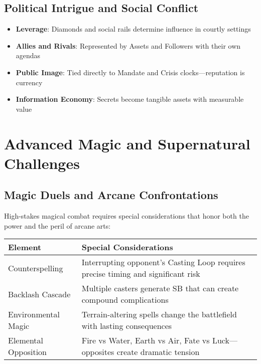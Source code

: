 \subsection*{Political Intrigue and Social Conflict}

\begin{itemize}
    \item \textbf{Leverage}: Diamonds and social rails determine influence in courtly settings
    \item \textbf{Allies and Rivals}: Represented by Assets and Followers with their own agendas
    \item \textbf{Public Image}: Tied directly to Mandate and Crisis clocks---reputation is currency
    \item \textbf{Information Economy}: Secrets become tangible assets with measurable value
\end{itemize}

\section*{Advanced Magic and Supernatural Challenges}

\subsection*{Magic Duels and Arcane Confrontations}

High-stakes magical combat requires special considerations that honor both the power and the peril of arcane arts:

\begin{fatebox}
\begin{tabularx}{\textwidth}{lX}
\toprule
\textbf{Element} & \textbf{Special Considerations} \\
\midrule
Counterspelling & Interrupting opponent's Casting Loop requires precise timing and significant risk \\
Backlash Cascade & Multiple casters generate SB that can create compound complications \\
Environmental Magic & Terrain-altering spells change the battlefield with lasting consequences \\
Elemental Opposition & Fire vs Water, Earth vs Air, Fate vs Luck---opposites create dramatic tension \\
\bottomrule
\end{tabularx}
\end{fatebox}

